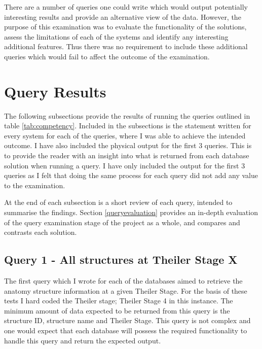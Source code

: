 There are a number of queries one could write which would output potentially interesting results and provide an alternative view of the data. However, the purpose of this examination was to evaluate the functionality of the solutions, assess the limitations of each of the systems and identify any interesting additional features. Thus there was no requirement to include these additional queries which would fail to affect the outcome of the examination.

\section{Query Results}\label{queryresults}
The following subsections provide the results of running the queries outlined in table \ref{tab:competency}. Included in the subsections is the statement written for every system for each of the queries, where I was able to achieve the intended outcome. I have also included the physical output for the first 3 queries. This is to provide the reader with an insight into what is returned from each database solution when running a query. I have only included the output for the first 3 queries as I felt that doing the same process for each query did not add any value to the examination.

At the end of each subsection is a short review of each query, intended to summarise the findings. Section \ref{queryevaluation} provides an in-depth evaluation of the query examination stage of the project as a whole, and compares and contrasts each solution.

\subsection*{Query 1 - All structures at Theiler Stage X}\label{query1}
The first query which I wrote for each of the databases aimed to retrieve the anatomy structure information at a given Theiler Stage. For the basis of these tests I hard coded the Theiler stage; Theiler Stage 4 in this instance.  The minimum amount of data expected to be returned from this query is the structure ID, structure name and Theiler Stage. This query is not complex and one would expect that each database will possess the required functionality to handle this query and return the expected output.


